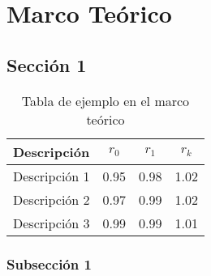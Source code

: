 \chapter{Marco Teórico}


\section{Sección 1}

\lipsum[6]

\begin{table}[H]
\centering
\caption{Tabla de ejemplo en el marco teórico}
\label{tab_ejemplo}
\begin{tabular}{lccc}
\toprule
\textbf{Descripción}     & \textbf{$r_{0}$} & \textbf{$r_{1}$} & \textbf{$r_{k}$} \\ \hline
Descripción 1 & 0.95 & 0.98 & 1.02 \\
Descripción 2 & 0.97 & 0.99 & 1.02 \\
Descripción 3 & 0.99 & 0.99 & 1.01 \\ 
\bottomrule
\end{tabular}
\end{table}

\subsection{Subsección 1}

\lipsum[7-8]

